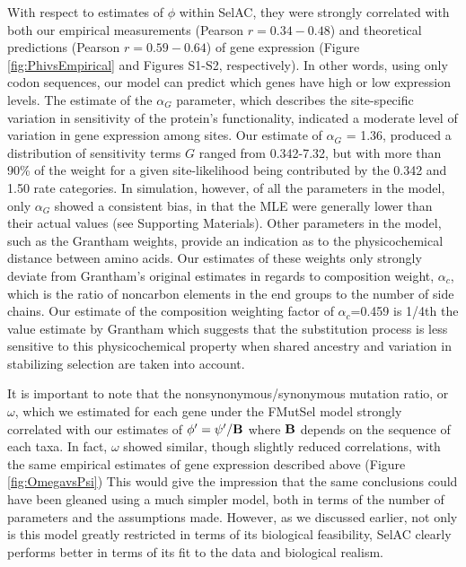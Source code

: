 \documentclass[12pt,letterpaper,fleqn]{article}
\newcommand{\Func}{\ensuremath{\text{\textbf{B}}}\xspace}
\newcommand{\selac}{SelAC\xspace}
\newcommand{\alphac}{\ensuremath{\alpha_c}\xspace}
\newcommand{\alphag}{\ensuremath{\alpha_G}\xspace}
\newcommand{\phiprime}{\ensuremath{\phi^\prime}\xspace}
\newcommand{\psiprime}{\ensuremath{\psi^\prime}\xspace}
\begin{document}
With respect to estimates of $\phi$ within \selac, they were strongly correlated with both our empirical measurements (Pearson $r = 0.34-0.48$) and theoretical predictions (Pearson $r = 0.59-0.64$) of gene expression (Figure \ref{fig:PhivsEmpirical} and Figures S1-S2, respectively).
In other words, using only codon sequences, our model can predict which genes have high or low expression levels.
The estimate of the $\alphag$ parameter, which describes the site-specific variation in sensitivity of the protein's functionality, indicated a moderate level of variation in gene expression among sites.
Our estimate of $\alphag$ = 1.36, produced a distribution of sensitivity terms $G$ ranged from 0.342-7.32, but with more than 90\% of the weight for a given site-likelihood being contributed by the 0.342 and 1.50 rate categories.
In simulation, however, of all the parameters in the model, only $\alphag$ showed a consistent bias, in that the MLE were generally lower than their actual values (see Supporting Materials).
Other parameters in the model, such as the Grantham weights, provide an indication as to the physicochemical distance between amino acids.
Our estimates of these weights only strongly deviate from Grantham's \citeyear{Grantham1974} original estimates in regards to composition weight, $\alphac$, which is the ratio of noncarbon elements in the end groups to the number of side chains.
Our estimate of the composition weighting factor of $\alphac$=0.459 is 1/4th the value estimate by Grantham which suggests that the substitution process is less sensitive to this physicochemical property when shared ancestry and variation in stabilizing selection are taken into account.

It is important to note that the nonsynonymous/synonymous mutation ratio, or $\omega$, which we estimated for each gene under the FMutSel model strongly correlated with our estimates of $\phiprime = \psiprime/\Func$ where $\Func$ depends on the sequence of each taxa.
In fact, $\omega$ showed similar, though slightly reduced correlations, with the same empirical estimates of gene expression described above (Figure \ref{fig:OmegavsPsi})
This would give the impression that the same conclusions could have been gleaned using a much simpler model, both in terms of the number of parameters and the assumptions made.
However, as we discussed earlier, not only is this model greatly restricted in terms of its biological feasibility, \selac clearly performs better in terms of its fit to the data and biological realism.
\end{document}
